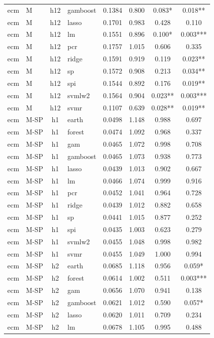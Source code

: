 \begin{ThreePartTable}
\begin{longtable}[t]{llclcccc}
ecm & M & h12 & gamboost & 0.1384 & 0.800 & 0.083* & 0.018**\\
ecm & M & h12 & lasso & 0.1701 & 0.983 & 0.428 & 0.110\\
ecm & M & h12 & lm & 0.1551 & 0.896 & 0.100* & 0.003***\\
ecm & M & h12 & pcr & 0.1757 & 1.015 & 0.606 & 0.335\\
ecm & M & h12 & ridge & 0.1591 & 0.919 & 0.119 & 0.023**\\
ecm & M & h12 & sp & 0.1572 & 0.908 & 0.213 & 0.034**\\
ecm & M & h12 & spi & 0.1544 & 0.892 & 0.176 & 0.019**\\
ecm & M & h12 & svmlw2 & 0.1564 & 0.904 & 0.023** & 0.003***\\
ecm & M & h12 & svmr & 0.1107 & 0.639 & 0.028** & 0.019**\\
\addlinespace
ecm & M-SP & h1 & earth & 0.0498 & 1.148 & 0.988 & 0.697\\
ecm & M-SP & h1 & forest & 0.0474 & 1.092 & 0.968 & 0.337\\
ecm & M-SP & h1 & gam & 0.0465 & 1.072 & 0.998 & 0.708\\
ecm & M-SP & h1 & gamboost & 0.0465 & 1.073 & 0.938 & 0.773\\
ecm & M-SP & h1 & lasso & 0.0439 & 1.013 & 0.902 & 0.667\\
ecm & M-SP & h1 & lm & 0.0466 & 1.074 & 0.999 & 0.916\\
ecm & M-SP & h1 & pcr & 0.0452 & 1.041 & 0.964 & 0.728\\
ecm & M-SP & h1 & ridge & 0.0439 & 1.012 & 0.882 & 0.658\\
ecm & M-SP & h1 & sp & 0.0441 & 1.015 & 0.877 & 0.252\\
ecm & M-SP & h1 & spi & 0.0435 & 1.003 & 0.623 & 0.279\\
ecm & M-SP & h1 & svmlw2 & 0.0455 & 1.048 & 0.998 & 0.982\\
ecm & M-SP & h1 & svmr & 0.0455 & 1.049 & 1.000 & 0.994\\
\addlinespace
ecm & M-SP & h2 & earth & 0.0685 & 1.118 & 0.956 & 0.059*\\
ecm & M-SP & h2 & forest & 0.0614 & 1.002 & 0.511 & 0.003***\\
ecm & M-SP & h2 & gam & 0.0656 & 1.070 & 0.941 & 0.138\\
ecm & M-SP & h2 & gamboost & 0.0621 & 1.012 & 0.590 & 0.057*\\
ecm & M-SP & h2 & lasso & 0.0620 & 1.011 & 0.709 & 0.234\\
ecm & M-SP & h2 & lm & 0.0678 & 1.105 & 0.995 & 0.488\\

\end{longtable}
\end{ThreePartTable}
